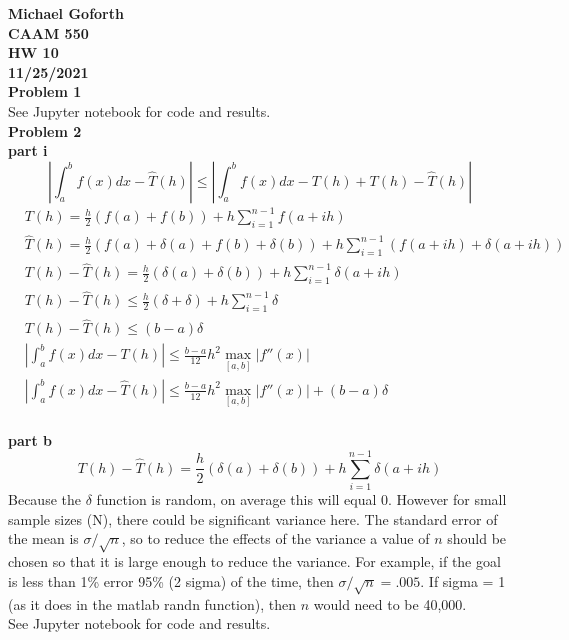 \documentclass{article} %
\begin{document}
\textbf{Michael Goforth} \\
\textbf{CAAM 550} \\
\textbf{HW 10} \\
\textbf{11/25/2021} \\ 

\textbf{Problem 1} \\
See Jupyter notebook for code and results.
\\


\textbf{Problem 2} \\

\textbf{part i} \\
\begin{equation*}
\left|\int_a^b f(x)dx -\hat{T}(h)\right| \leq \left|\int_a^b f(x)dx -T(h) + T(h) - \hat{T}(h)\right|
\end{equation*}
\begin{align*}
&T(h) = \frac{h}{2}(f(a) + f(b)) + h \sum_{i=1}^{n-1}f(a+ih)  \\
&\hat{T}(h) = \frac{h}{2}(f(a) + \delta(a) + f(b)+ \delta(b)) + h \sum_{i=1}^{n-1}(f(a+ih)+ \delta(a+ih)) \\
&T(h) - \hat{T}(h) = \frac{h}{2}(\delta(a) + \delta(b)) + h \sum_{i=1}^{n-1}\delta(a+ih) \\
&T(h) - \hat{T}(h) \leq \frac{h}{2}(\delta + \delta) + h \sum_{i=1}^{n-1}\delta \\
&T(h) - \hat{T}(h) \leq (b-a)\delta \\
&\left|\int_a^b f(x)dx -T(h)\right| \leq \frac{b-a}{12}h^2 \max_{[a,b]}|f''(x)| \\
&\left|\int_a^b f(x)dx -\hat{T}(h)\right| \leq \frac{b-a}{12}h^2 \max_{[a,b]}|f''(x)| + (b-a)\delta
\end{align*}
\\

\textbf{part b} \\
\begin{equation*}
T(h) - \hat{T}(h) = \frac{h}{2}(\delta(a) + \delta(b)) + h \sum_{i=1}^{n-1}\delta(a+ih)
\end{equation*}
Because the $\delta$ function is random, on average this will equal $0$. However for small sample sizes (N), there could be significant variance here.  The standard error of the mean is $\sigma/\sqrt{n}$, so to reduce the effects of the variance a value of $n$ should be chosen so that it is large enough to reduce the variance.  For example, if the goal is less than 1\% error 95\% (2 sigma) of the time, then $\sigma/\sqrt{n} = .005$.  If sigma = 1 (as it does in the matlab randn function), then $n$ would need to be  40,000. \\
See Jupyter notebook for code and results.
\\
\end{document}
